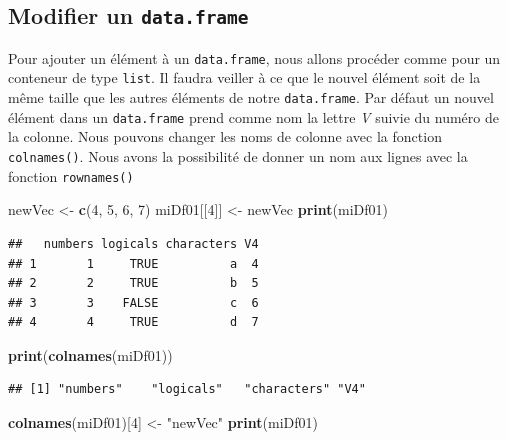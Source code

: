 \documentclass[
]{book}
\newenvironment{Shaded}{\begin{snugshade}}{\end{snugshade}}
\newcommand{\DecValTok}[1]{\textcolor[rgb]{0.00,0.00,0.81}{#1}}
\newcommand{\KeywordTok}[1]{\textcolor[rgb]{0.13,0.29,0.53}{\textbf{#1}}}
\newcommand{\NormalTok}[1]{#1}
\newcommand{\StringTok}[1]{\textcolor[rgb]{0.31,0.60,0.02}{#1}}
\begin{document}
\hypertarget{modifier-un-data.frame}{%
\subsection{\texorpdfstring{Modifier un \texttt{data.frame}}{Modifier un data.frame}}\label{modifier-un-data.frame}}

Pour ajouter un élément à un \texttt{data.frame}, nous allons procéder comme pour un conteneur de type \texttt{list}. Il faudra veiller à ce que le nouvel élément soit de la même taille que les autres éléments de notre \texttt{data.frame}. Par défaut un nouvel élément dans un \texttt{data.frame} prend comme nom la lettre \emph{V} suivie du numéro de la colonne. Nous pouvons changer les noms de colonne avec la fonction \texttt{colnames()}. Nous avons la possibilité de donner un nom aux lignes avec la fonction \texttt{rownames()}

\begin{Shaded}
\begin{Highlighting}[]
\NormalTok{newVec <-}\StringTok{ }\KeywordTok{c}\NormalTok{(}\DecValTok{4}\NormalTok{, }\DecValTok{5}\NormalTok{, }\DecValTok{6}\NormalTok{, }\DecValTok{7}\NormalTok{)}
\NormalTok{miDf01[[}\DecValTok{4}\NormalTok{]] <-}\StringTok{ }\NormalTok{newVec}
\KeywordTok{print}\NormalTok{(miDf01)}
\end{Highlighting}
\end{Shaded}

\begin{verbatim}
##   numbers logicals characters V4
## 1       1     TRUE          a  4
## 2       2     TRUE          b  5
## 3       3    FALSE          c  6
## 4       4     TRUE          d  7
\end{verbatim}

\begin{Shaded}
\begin{Highlighting}[]
\KeywordTok{print}\NormalTok{(}\KeywordTok{colnames}\NormalTok{(miDf01))}
\end{Highlighting}
\end{Shaded}

\begin{verbatim}
## [1] "numbers"    "logicals"   "characters" "V4"
\end{verbatim}

\begin{Shaded}
\begin{Highlighting}[]
\KeywordTok{colnames}\NormalTok{(miDf01)[}\DecValTok{4}\NormalTok{] <-}\StringTok{ "newVec"}
\KeywordTok{print}\NormalTok{(miDf01)}
\end{Highlighting}
\end{Shaded}
\end{document}
